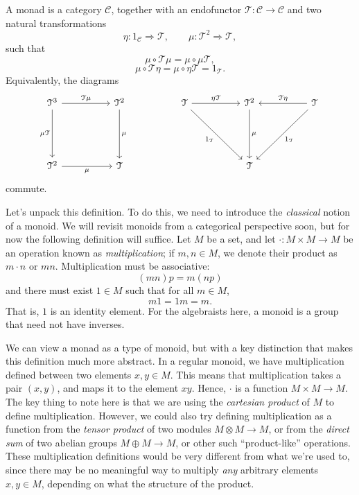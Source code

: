 \begin{definition}[Monad]\label{dfn:10}
	A monad is a category $\mathcal{C} $, together with an endofunctor $\mathcal{T} : \mathcal{C}  \to \mathcal{C} $ and two natural transformations
	\[
		\eta : 1_{\mathcal{C} }  \Rightarrow \mathcal{T} ,\qquad \mu : \mathcal{T} ^2 \Rightarrow \mathcal{T} ,
	\]
	such that
	\[
		\mu \circ \mathcal{T} \mu =\mu \circ \mu \mathcal{T} ,
	\]
	\[
		\mu \circ \mathcal{T} \eta =\mu \circ \eta \mathcal{T} =1_{\mathcal{T} } 
	.\]
	Equivalently, the diagrams
	\[\begin{tikzcd}[row sep = 5em, column sep = 5em]
	\mathcal{T} ^3\ar[" \mathcal{T} \mu  ", r] \ar[" \mu \mathcal{T}  "', d]  & \mathcal{T} ^2\ar[" \mu  ", d]  & \mathcal{T} \ar[" \eta \mathcal{T}  ", r] \ar[" 1_{\mathcal{T} }  "', dr]  & \mathcal{T} ^2\ar[" \mu  ", d]  & \mathcal{T} \ar[" \mathcal{T} \eta  "', l] \ar[" 1_{\mathcal{T} }  ", dl]  \\
	\mathcal{T} ^2\ar[" \mu  "', r]  & \mathcal{T}  &  & \mathcal{T}  & 
	\end{tikzcd}\]
	commute.
\end{definition}

Let's unpack this definition. To do this, we need to introduce the \emph{classical} notion of a monoid. We will revisit monoids from a categorical perspective soon, but for now the following definition will suffice. Let $M$ be a set, and let $\cdot : M\times M \to M$ be an operation known as \emph{multiplication}; if $m,n\in M$, we denote their product as $m\cdot n$ or $mn$. Multiplication must be associative:
\[
	(mn)p=m(np)
\]
and there must exist $1\in M$ such that for all $m\in M$,
\[
	m1=1m=m
.\]
That is, $1$ is an identity element. For the algebraists here, a monoid is a group that need not have inverses.

We can view a monad as a type of monoid, but with a key distinction that makes this definition much more abstract. In a regular monoid, we have multiplication defined between two elements $x,y\in M$. This means that multiplication takes a pair $(x,y)$, and maps it to the element $xy$. Hence, $\cdot $ is a function $M\times M\to M$. The key thing to note here is that we are using the \emph{cartesian product} of $M$ to define multiplication. However, we could also try defining multiplication as a function from the \emph{tensor product} of two modules $M\otimes M\to M$, or from the \emph{direct sum} of two abelian groups $M\oplus M\to M$, or other such ``product-like'' operations. These multiplication definitions would be very different from what we're used to, since there may be no meaningful way to multiply \emph{any} arbitrary elements $x,y\in M$, depending on what the structure of the product.

